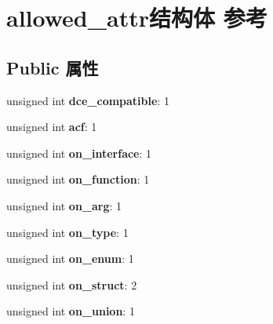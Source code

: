 \hypertarget{structallowed__attr}{}\section{allowed\+\_\+attr结构体 参考}
\label{structallowed__attr}
\subsection*{Public 属性}
\begin{DoxyCompactItemize}
\item 
\mbox{\label{structallowed__attr_adabe80ef12dd3017cb718608bf0e1a73}} 
unsigned int {\bfseries dce\+\_\+compatible}\+: 1
\item 
\mbox{\label{structallowed__attr_a9d3764502ca2101cd1529b427e5fe059}} 
unsigned int {\bfseries acf}\+: 1
\item 
\mbox{\label{structallowed__attr_a3c4a36704929327235f011126a2e6e0d}} 
unsigned int {\bfseries on\+\_\+interface}\+: 1
\item 
\mbox{\label{structallowed__attr_aad0553e38e4b1a3e5bb52018d2a0565f}} 
unsigned int {\bfseries on\+\_\+function}\+: 1
\item 
\mbox{\label{structallowed__attr_aefb9ee552174b270a6521874d1c5416a}} 
unsigned int {\bfseries on\+\_\+arg}\+: 1
\item 
\mbox{\label{structallowed__attr_a6139e941dae61a9f93c6c9f7a16d86db}} 
unsigned int {\bfseries on\+\_\+type}\+: 1
\item 
\mbox{\label{structallowed__attr_a1fe9b31f63955e315ff1018768e73b60}} 
unsigned int {\bfseries on\+\_\+enum}\+: 1
\item 
\mbox{\label{structallowed__attr_a5d71ca81ce556822627d70a738a24f4b}} 
unsigned int {\bfseries on\+\_\+struct}\+: 2
\item 
\mbox{\label{structallowed__attr_a5ce90032917ec1fe8d1b49038e8f0e55}} 
unsigned int {\bfseries on\+\_\+union}\+: 1

\end{DoxyCompactItemize}
